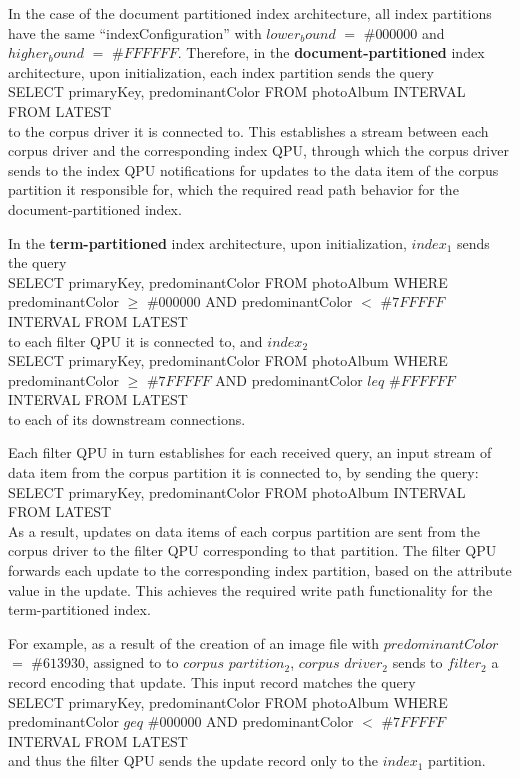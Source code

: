 \noindent
In the case of the document partitioned index architecture, all index partitions have the same ``indexConfiguration'' with
$lower_bound$ $=$ $\#000000$ and $higher_bound$ $=$ $\#FFFFFF$.
Therefore, in the \textbf{document-partitioned} index architecture, upon initialization, each index partition sends the query \\
{\obeylines\obeyspaces
  SELECT primaryKey, predominantColor
  FROM photoAlbum
  INTERVAL FROM LATEST
} ~\\
to the corpus driver it is connected to.
This establishes a stream between each corpus driver and the corresponding index QPU, through which the corpus driver
sends to the index QPU notifications for updates to the data item of the corpus partition it responsible for,
which the required read path behavior for the document-partitioned index.

\medskip
\noindent
In the \textbf{term-partitioned} index architecture, upon initialization, $index_1$ sends the query \\
{\obeylines\obeyspaces
    SELECT primaryKey, predominantColor
    FROM photoAlbum
    WHERE predominantColor $\geq$ $\#000000$ AND predominantColor $<$ $\#7FFFFF$
    INTERVAL FROM LATEST
} ~\\
to each filter QPU it is connected to, and $index_2$ \\
{\obeylines\obeyspaces
  SELECT primaryKey, predominantColor
  FROM photoAlbum
  WHERE predominantColor $\geq$ $\#7FFFFF$ AND predominantColor $leq$ $\#FFFFFF$
  INTERVAL FROM LATEST
} ~\\
to each of its downstream connections.

\noindent
Each filter QPU in turn establishes for each received query, an input stream of data item from the corpus partition it
is connected to, by sending the query: \\
{\obeylines\obeyspaces
  SELECT primaryKey, predominantColor
  FROM photoAlbum
  INTERVAL FROM LATEST
} ~\\
As a result, updates on data items of each corpus partition are sent from the corpus driver to the filter QPU corresponding
to that partition.
The filter QPU forwards each update to the corresponding index partition, based on the attribute value in the update.
This achieves the required write path functionality for the term-partitioned index.

For example, as a result of the creation of an image file with $predominantColor$ $=$ $\#613930$, assigned to to $corpus$
$partition_2$, $corpus$ $driver_2$ sends to $filter_2$ a record encoding that update.
This input record matches the query \\
{\obeylines\obeyspaces
    SELECT primaryKey, predominantColor
    FROM photoAlbum
    WHERE predominantColor $geq$ $\#000000$ AND predominantColor $<$ $\#7FFFFF$
    INTERVAL FROM LATEST
} ~\\
and thus the filter QPU sends the update record only to the $index_1$ partition.

